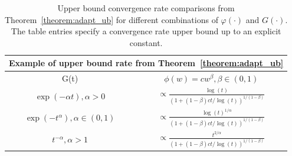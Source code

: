 \documentclass[12pt]{article}
\theoremstyle{plain}
\theoremstyle{remark}
\let\temp\phi
\let\phi\varphi
\let\varphi\temp
\begin{document}
\begin{table}
\begin{center}
\renewcommand{\arraystretch}{2}
\begin{tabular}[t]{| c | c |}
\hline
\multicolumn{2}{|c|}{Example of upper bound rate from Theorem~\ref{theorem:adapt_ub}} 
\\
\hline
G(t) 
& $\phi(w) = c w^{\beta}, \beta \in (0, 1)$ 
\\ 
\hline
$\exp(-\alpha t), \alpha > 0$ 
& $\propto \frac{\log(t)}{( 1 + (1 - \beta) c t / \log(t))^{1/(1 - \beta)} }$ 
\\
\hline
$\exp(-t^\alpha), \alpha \in (0, 1)$ 
& $\propto \frac{ \log(t)^{1/\alpha} }{ ( 1 + (1 - \beta) c t / \log(t))^{1/(1 - \beta)} }$ 
\\
\hline
$t^{-\alpha}, \alpha > 1$ 
& $\propto \frac{ t^{2/\alpha} }{ ( 1 + (1 - \beta) c t / \log(t))^{1/(1 - \beta)} }$ 
\\
\hline
\end{tabular}
\end{center}
\caption{Upper bound convergence rate comparisons from Theorem~\ref{theorem:adapt_ub} for different combinations of $\phi(\cdot)$ and $G(\cdot)$. The table entries specify a convergence rate upper bound up to an explicit constant.}
\label{table:adapt_ub}
\end{table}
\end{document}
